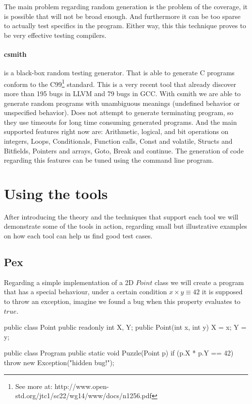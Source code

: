 \documentclass{llncs}
\begin{document}
The main problem regarding random generation is the problem of the coverage, it is possible that will not be broad enough. And furthermore it can be
too sparse to actually test specifics in the program. Either way, this this technique proves to be very effective testing compilers.

\paragraph{\textbf{csmith}\cite{Yang:2011:FUB:1993316.1993532}} is a black-box random testing generator. That is able to generate C programs
conform to the C99\footnote{See more at: http://www.open-std.org/jtc1/sc22/wg14/www/docs/n1256.pdf} standard. This is a very recent tool that already discover
more than 195 bugs in LLVM and 79 bugs in GCC. With csmith we are able to generate random programs with unambiguous meanings (undefined behavior or 
unspecified behavior). Does not attempt to generate terminating program, so they use timeouts for long time consuming generated programs.
And the main supported features right now are: Arithmetic, logical, and bit operations on integers, Loops, Conditionals, Function calls, Const and volatile,
Structs and Bitfields, Pointers and arrays, Goto, Break and continue. The generation of code regarding this features can be tuned using the command line program.

\section{Using the tools}
After introducing the theory and the techniques that support each tool we will demonstrate some of the tools in action, regarding small but illustrative examples
on how each tool can help us find good test cases.

\subsection{Pex}
Regarding a simple implementation of a 2D $Point$ class we will create a program that has a special behaviour, under a certain condition
$x \times y \equiv 42$ it is supposed to throw an exception, imagine we found a bug when this property evaluates to $true$.

\begin{code}
public class Point  {
  public readonly int X, Y;
  public Point(int x, int y) { X = x; Y = y; }
}

public class Program {
  public static void Puzzle(Point p) {
    if (p.X * p.Y == 42)
        throw new Exception("hidden bug!");
	}
}
\end{code}
\end{document}

